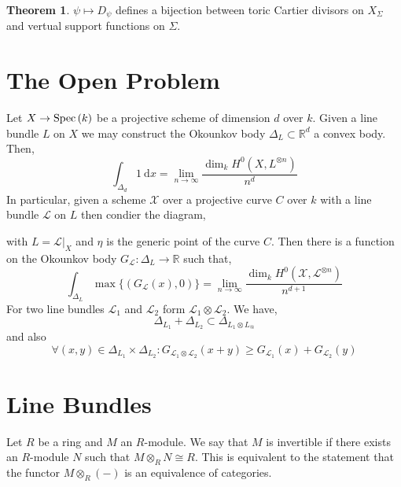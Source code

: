 \documentclass[12pt]{extarticle}
\newcommand{\R}{\mathbb{R}}
\theoremstyle{definition}
\newtheorem{theorem}{Theorem}[section]
\newenvironment{definition}[1][Definition:]{\begin{trivlist}
\item[\hskip \labelsep {\bfseries #1}]}{\end{trivlist}}
\renewcommand{\d}[1]{\mathrm{d} #1}
\begin{document}
\begin{theorem}
$\psi \mapsto D_\psi$ defines a bijection between toric Cartier divisors on $X_\Sigma$ and vertual support functions on $\Sigma$. 
\end{theorem}

\section{The Open Problem}

Let $X \to \mathrm{Spec}\left( k \right)$ be a projective scheme of dimension $d$ over $k$. Given a line bundle $L$ on $X$ we may construct the Okounkov body $\Delta_L \subset \R^d$ a convex body. Then,
\[ \int_{\Delta_d} 1
\:  \d{x} = \lim_{n \to \infty} \frac{\dim_k H^0(X, L^{\otimes n})}{n^d} \]
In particular, given a scheme $\mathcal{X}$ over a projective curve $C$ over $k$ with a line bundle $\mathcal{L}$ on $L$ then condier the diagram,
\begin{center}
\end{center}
with $L = \mathcal{L}|_X$ and $\eta$ is the generic point of the curve $C$. Then there is a function on the Okounkov body $G_{\mathcal{L}} : \Delta_L \to \R$ such that,
\[ \int_{\Delta_L} \max\{(G_{\mathcal{L}}(x), 0)\} = \lim_{n \to \infty} \frac{\dim_k H^0(\mathcal{X}, \mathcal{L}^{\otimes n})}{n^{d+1}} \]
For two line bundles $\mathcal{L}_1$ and $\mathcal{L}_2$ form $\mathcal{L}_1 \otimes \mathcal{L}_2$. We have,
\[ \Delta_{L_1} + \Delta_{L_2} \subset \Delta_{L_1 \otimes L_@} \]
and also
\[ \forall (x, y) \in \Delta_{L_1} \times \Delta_{L_2} : G_{\mathcal{L}_1 \otimes \mathcal{L}_2}(x + y) \ge G_{\mathcal{L}_1}(x) + G_{\mathcal{L}_2}(y) \] 

\section{Line Bundles}

\begin{definition}
Let $R$ be a ring and $M$ an $R$-module. We say that $M$ is invertible if there exists an $R$-module $N$ such that $M \otimes_R N \cong R$. This is equivalent to the statement that the functor $M \otimes_R (-)$ is an equivalence of categories. 
\end{definition}
\end{document}
